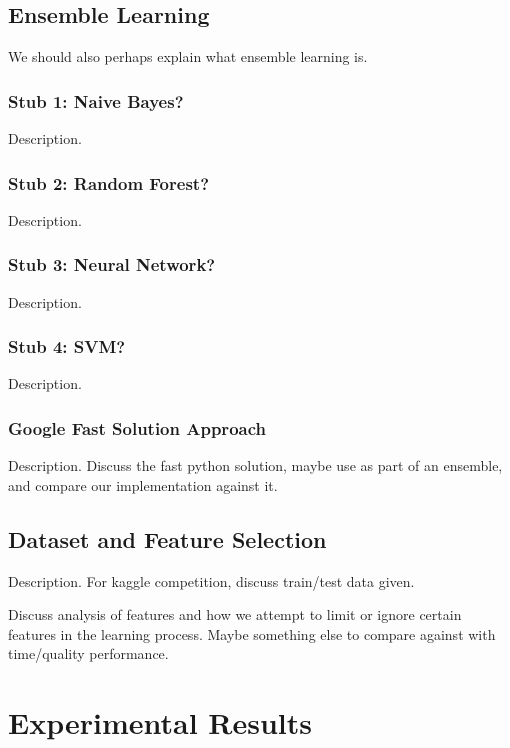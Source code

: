 \documentclass{article} %
\begin{document}
\subsection{Ensemble Learning}

We should also perhaps explain what ensemble learning is.

\subsubsection{Stub 1: Naive Bayes?}

Description.

\subsubsection{Stub 2: Random Forest?}

Description.

\subsubsection{Stub 3: Neural Network?}

Description.

\subsubsection{Stub 4: SVM?}

Description.

\subsubsection{Google Fast Solution Approach}

Description. Discuss the fast python solution, maybe use as part of an ensemble, and compare our implementation against it.

\subsection{Dataset and Feature Selection} %

Description. For kaggle competition, discuss train/test data given.

Discuss analysis of features and how we attempt to limit or ignore certain features in the learning process. Maybe something else to compare against with time/quality performance.

\section{Experimental Results}
\end{document}
